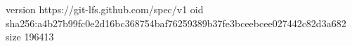version https://git-lfs.github.com/spec/v1
oid sha256:a4b27b99fc0e2d16bc368754baf76259389b37fe3bceebcee027442c82d3a682
size 196413
